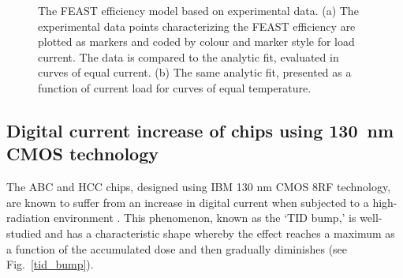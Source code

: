 \begin{figure}[ht]
\centering
{}\quad\quad
{}
\caption{The FEAST efficiency model based on experimental data. (a) The experimental data points
characterizing the FEAST efficiency are plotted as markers and coded by colour and marker style for load current. The data is
compared to the analytic fit, evaluated in curves of equal current. (b) The same analytic fit,
presented as a function of current load for curves of equal temperature.
}
\label{fig:feast_eff}
\end{figure}


\subsection{Digital current increase of chips using 130~nm CMOS technology}
\label{sec:tid_explanation}

The ABC and HCC chips, designed using IBM 130 nm CMOS 8RF technology, are known to suffer from an
increase in digital current when subjected to a high-radiation environment
\cite{Collaboration:2017mtb}. This phenomenon, known as the `TID bump,' is well-studied
\cite{1589217,FACCIO20081000} and has a characteristic shape whereby the effect reaches a maximum
as a function of the accumulated dose and then gradually diminishes (see Fig.~\ref{tid_bump}).

